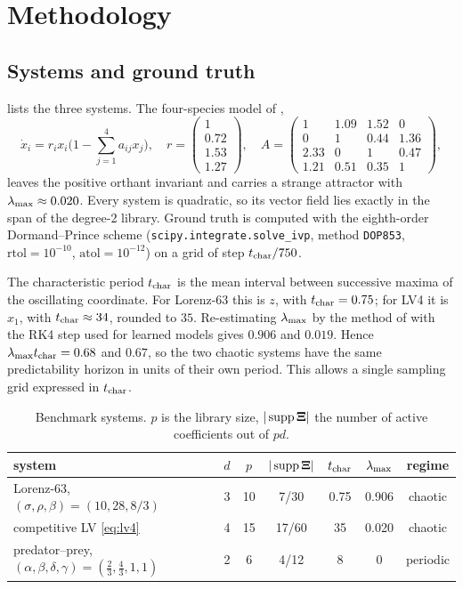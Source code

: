 \chapter{Methodology}\label{ch:method}

\section{Systems and ground truth}\label{sec:systems}

 lists the three systems. The four-species model of \textcite{vano2006chaos},
\begin{equation}\label{eq:lv4}
  \dot x_i = r_i x_i\Big(1-\sum_{j=1}^4 a_{ij}x_j\Big),\quad
  r=\begin{pmatrix}1\\0.72\\1.53\\1.27\end{pmatrix},\quad
  A=\begin{pmatrix}1&1.09&1.52&0\\0&1&0.44&1.36\\2.33&0&1&0.47\\1.21&0.51&0.35&1\end{pmatrix},
\end{equation}
leaves the positive orthant invariant and carries a strange attractor with $\lambda_{\max}\approx0.020$. Every system is quadratic, so its vector field lies exactly in the span of the degree-2 library. Ground truth is computed with the eighth-order Dormand--Prince scheme \parencite{hairer1993solving} (\texttt{scipy.integrate.solve\_ivp}, method \texttt{DOP853}, $\mathrm{rtol}=10^{-10}$, $\mathrm{atol}=10^{-12}$) on a grid of step $t_{\mathrm{char}}/750$.

The characteristic period $t_{\mathrm{char}}$ is the mean interval between successive maxima of the oscillating coordinate. For Lorenz-63 this is $z$, with $t_{\mathrm{char}}=0.75$; for LV4 it is $x_1$, with $t_{\mathrm{char}}\approx 34$, rounded to $35$. Re-estimating $\lambda_{\max}$ by the method of \textcite{benettin1980lyapunov} with the RK4 step used for learned models gives $0.906$ and $0.019$. Hence $\lambda_{\max}t_{\mathrm{char}}=0.68$ and $0.67$, so the two chaotic systems have the same predictability horizon in units of their own period. This allows a single sampling grid expressed in $t_{\mathrm{char}}$.

\begin{table}[t]
\centering
\caption{Benchmark systems. $p$ is the library size, $|\operatorname{supp}\bm{\Xi}|$ the number of active coefficients out of $pd$.}
\label{tab:systems}
\small
\begin{tabular}{lcccccc}
\toprule
system & $d$ & $p$ & $|\operatorname{supp}\bm{\Xi}|$ & $t_{\mathrm{char}}$ & $\lambda_{\max}$ & regime \\
\midrule
Lorenz-63, $(\sigma,\rho,\beta)=(10,28,8/3)$ & 3 & 10 & 7/30 & 0.75 & 0.906 & chaotic \\
competitive LV \eqref{eq:lv4} & 4 & 15 & 17/60 & 35 & 0.020 & chaotic \\
predator--prey, $(\alpha,\beta,\delta,\gamma)=(\tfrac23,\tfrac43,1,1)$ & 2 & 6 & 4/12 & 8 & 0 & periodic \\
\bottomrule
\end{tabular}
\end{table}

